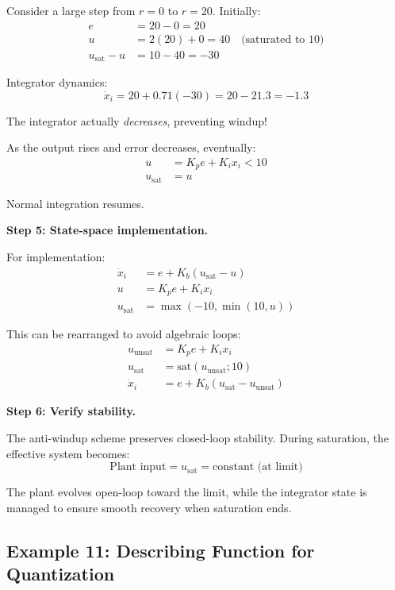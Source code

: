\begin{example}
Consider a large step from $r = 0$ to $r = 20$. Initially:
\begin{align}
e &= 20 - 0 = 20 \\
u &= 2(20) + 0 = 40 \quad \text{(saturated to 10)} \\
u_{\text{sat}} - u &= 10 - 40 = -30
\end{align}

Integrator dynamics:
\begin{equation}
\dot{x}_i = 20 + 0.71(-30) = 20 - 21.3 = -1.3
\end{equation}

The integrator actually \textit{decreases}, preventing windup!

As the output rises and error decreases, eventually:
\begin{align}
u &= K_p e + K_i x_i < 10 \\
u_{\text{sat}} &= u
\end{align}

Normal integration resumes.

\textbf{Step 5: State-space implementation.}

For implementation:
\begin{align}
\dot{x}_i &= e + K_b(u_{\text{sat}} - u) \\
u &= K_p e + K_i x_i \\
u_{\text{sat}} &= \max(-10, \min(10, u))
\end{align}

This can be rearranged to avoid algebraic loops:
\begin{align}
u_{\text{unsat}} &= K_p e + K_i x_i \\
u_{\text{sat}} &= \text{sat}(u_{\text{unsat}}; 10) \\
\dot{x}_i &= e + K_b(u_{\text{sat}} - u_{\text{unsat}})
\end{align}

\textbf{Step 6: Verify stability.}

The anti-windup scheme preserves closed-loop stability. During saturation, the effective system becomes:
\begin{equation}
\text{Plant input} = u_{\text{sat}} = \text{constant (at limit)}
\end{equation}

The plant evolves open-loop toward the limit, while the integrator state is managed to ensure smooth recovery when saturation ends.
\end{example}

\subsection{Example 11: Describing Function for Quantization}

